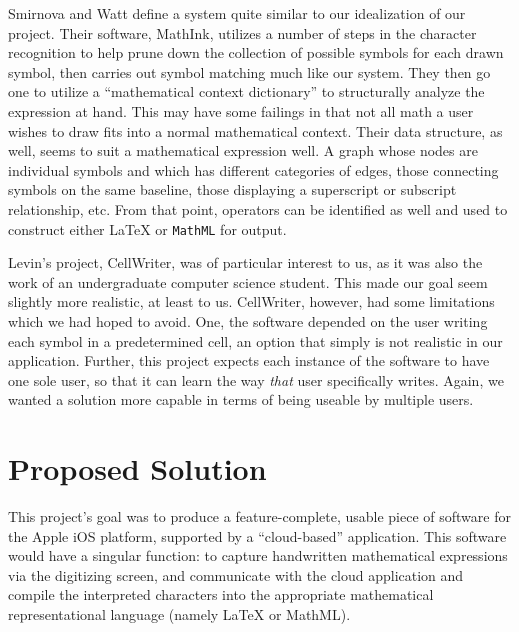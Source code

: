 \documentclass{acm_proc_article-sp}
\begin{document}
Smirnova and Watt\cite{Smirnova2006} define a system quite similar to our idealization of our project. Their software, MathInk, utilizes a number of steps in the character recognition to help prune down the collection of possible symbols for each drawn symbol, then carries out symbol matching much like our system. They then go one to utilize a ``mathematical context dictionary'' to structurally analyze the expression at hand. This may have some failings in that not all math a user wishes to draw fits into a normal mathematical context. Their data structure, as well, seems to suit a mathematical expression well. A graph whose nodes are individual symbols and which has different categories of edges, those connecting symbols on the same baseline, those displaying a superscript or subscript relationship, etc. From that point, operators can be identified as well and used to construct either \LaTeX{} or \texttt{MathML} for output.

Levin's project, CellWriter, was of particular interest to us, as it was also the work of an undergraduate computer science student. This made our goal seem slightly more realistic, at least to us. CellWriter, however, had some limitations which we had hoped to avoid. One, the software depended on the user writing each symbol in a predetermined cell, an option that simply is not realistic in our application. Further, this project expects each instance of the software to have one sole user, so that it can learn the way \emph{that} user specifically writes. Again, we wanted a solution more capable in terms of being useable by multiple users.

\section{Proposed Solution}
This project's goal was to produce a feature-complete, usable piece of software for the Apple iOS platform, supported by a ``cloud-based'' application. This software would have a singular function: to capture handwritten mathematical expressions via the digitizing screen, and communicate with the cloud application and compile the interpreted characters into the appropriate mathematical representational language (namely \LaTeX{} or MathML).
\end{document}
